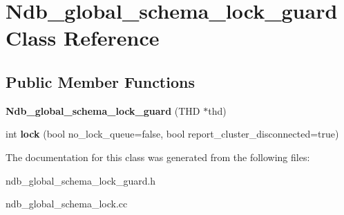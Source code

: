 \hypertarget{classNdb__global__schema__lock__guard}{}\section{Ndb\+\_\+global\+\_\+schema\+\_\+lock\+\_\+guard Class Reference}
\label{classNdb__global__schema__lock__guard}
\subsection*{Public Member Functions}
\begin{DoxyCompactItemize}
\item 
\mbox{\label{classNdb__global__schema__lock__guard_aed16e5025b150096334db615b62bc65a}} 
{\bfseries Ndb\+\_\+global\+\_\+schema\+\_\+lock\+\_\+guard} (T\+HD $\ast$thd)
\item 
\mbox{\label{classNdb__global__schema__lock__guard_ac9d54541ca1a923df901e1604a8b56f9}} 
int {\bfseries lock} (bool no\+\_\+lock\+\_\+queue=false, bool report\+\_\+cluster\+\_\+disconnected=true)
\end{DoxyCompactItemize}


The documentation for this class was generated from the following files\+:\begin{DoxyCompactItemize}
\item 
ndb\+\_\+global\+\_\+schema\+\_\+lock\+\_\+guard.\+h\item 
ndb\+\_\+global\+\_\+schema\+\_\+lock.\+cc\end{DoxyCompactItemize}
